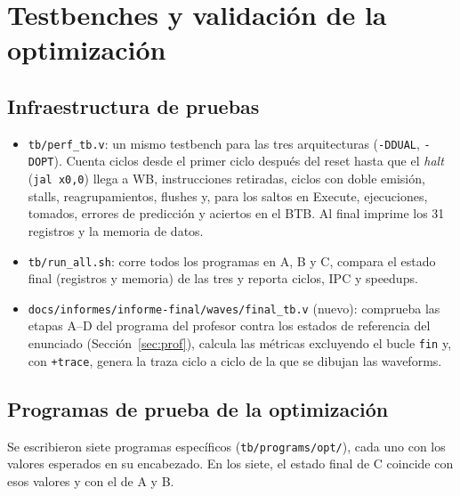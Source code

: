 \documentclass[12pt,a4paper]{article}
\begin{document}
\section{Testbenches y validación de la optimización}
\label{sec:valid}

\subsection{Infraestructura de pruebas}

\begin{itemize}
    \item \texttt{tb/perf\_tb.v}: un mismo testbench para las tres arquitecturas (\texttt{-DDUAL}, \texttt{-DOPT}). Cuenta ciclos desde el primer ciclo después del reset hasta que el \textit{halt} (\texttt{jal x0,0}) llega a WB, instrucciones retiradas, ciclos con doble emisión, stalls, reagrupamientos, flushes y, para los saltos en Execute, ejecuciones, tomados, errores de predicción y aciertos en el BTB. Al final imprime los 31 registros y la memoria de datos.
    \item \texttt{tb/run\_all.sh}: corre todos los programas en A, B y C, compara el estado final (registros y memoria) de las tres y reporta ciclos, IPC y speedups.
    \item \texttt{docs/informes/informe-final/waves/final\_tb.v} (nuevo): comprueba las etapas A--D del programa del profesor contra los estados de referencia del enunciado (Sección~\ref{sec:prof}), calcula las métricas excluyendo el bucle \texttt{fin} y, con \texttt{+trace}, genera la traza ciclo a ciclo de la que se dibujan las waveforms.
\end{itemize}

\subsection{Programas de prueba de la optimización}

Se escribieron siete programas específicos (\texttt{tb/programs/opt/}), cada uno con los valores esperados en su encabezado. En los siete, el estado final de C coincide con esos valores y con el de A y B.
\end{document}
